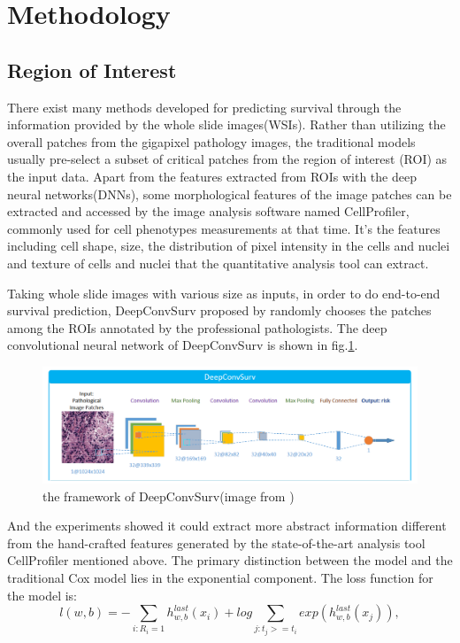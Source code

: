\documentclass[journal,twoside,web]{ieeecolor}
\begin{document}
\section{Methodology}
\subsection{Region of Interest}
There exist many methods developed for predicting survival through the information provided by the whole slide images(WSIs).
Rather than utilizing the overall patches from the gigapixel pathology images, the traditional models usually pre-select a subset of critical patches from the region of interest (ROI) as the input data.
Apart from the features extracted from ROIs with the deep neural networks(DNNs), some morphological features of the image patches can be extracted and accessed by the image analysis software named CellProfiler\cite{lamprecht2007cellprofiler}, commonly used for cell phenotypes measurements at that time.
It's the features including cell shape, size, the distribution of pixel intensity in the cells and nuclei and texture of cells and nuclei that the quantitative analysis tool can extract.

Taking whole slide images with various size as inputs, in order to do end-to-end survival prediction, DeepConvSurv proposed by \cite{zhu2016deep} randomly chooses the patches among the ROIs annotated by the professional pathologists.
The deep convolutional neural network of DeepConvSurv is shown in fig.\ref{DeepConvSurv}.
\begin{figure}
    \centering
    \includegraphics[width=0.8\linewidth]{img/deepconvsurv.png}
    \caption{the framework of DeepConvSurv(image from \cite{zhu2016deep})}
    \label{DeepConvSurv}
\end{figure}
And the experiments showed it could extract more abstract information different from the hand-crafted features generated by the state-of-the-art analysis tool CellProfiler mentioned above.
The primary distinction between the model and the traditional Cox model lies in the exponential component. The loss function for the model is:
\begin{equation}
l(w,b)=-\sum_{i:R_i=1}h_{w,b}^{last}(x_i)+log\sum_{j:t_j>=t_i}exp(h_{w,b}^{last}(x_j)),
\end{equation}
\end{document}
